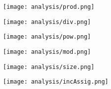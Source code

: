 \begin{multicols}{2}
\begin{center}
\texttt{[image: analysis/prod.png]} 
\end{center}
\columnbreak
\begin{center}
\texttt{[image: analysis/div.png]} 
\end{center}
\end{multicols}
\pagebreak

\begin{multicols}{2}
\begin{center}
\texttt{[image: analysis/pow.png]} 
\end{center}
\columnbreak
\begin{center}
\texttt{[image: analysis/mod.png]} 
\end{center}
\end{multicols}

\begin{multicols}{2}
\begin{center}
\texttt{[image: analysis/size.png]} 
\end{center}
\columnbreak
\begin{center}
\texttt{[image: analysis/incAssig.png]} 
\end{center}
\end{multicols}

